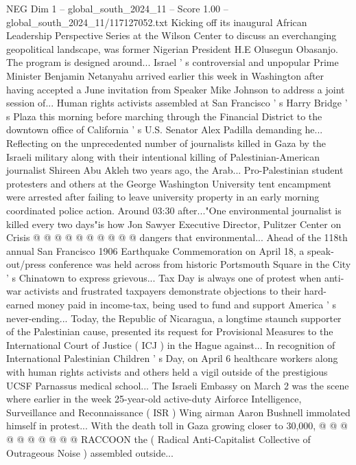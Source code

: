 \begin{textsample}{NEG Dim 1 – global\_south\_2024\_11 – Score 1.00 – global\_south\_2024\_11/117127052.txt}  \label{ex:f1_neg_282}
Kicking off its inaugural African Leadership Perspective Series at the Wilson Center to discuss an everchanging geopolitical landscape, was former Nigerian President H.E Olusegun Obasanjo.
The program is designed around...
Israel ' s controversial and unpopular Prime Minister Benjamin Netanyahu arrived earlier this week in Washington after having accepted a June invitation from Speaker Mike Johnson to address a joint session of...
Human rights activists assembled at San Francisco ' s Harry Bridge ' s Plaza this morning before marching through the Financial District to the downtown office of California ' s U.S.
Senator Alex Padilla demanding he...
Reflecting on the unprecedented number of journalists killed in Gaza by the Israeli military along with their intentional killing of Palestinian-American journalist Shireen Abu Akleh two years ago, the Arab...
Pro-Palestinian student protesters and others at the George Washington University tent encampment were arrested after failing to leave university property in an early morning coordinated police action.
Around 03:30 after..."One environmental journalist is killed every two days"is how Jon Sawyer Executive Director, Pulitzer Center on Crisis @ @ @ @ @ @ @ @ @ @ dangers that environmental...
Ahead of the 118th annual San Francisco 1906 Earthquake Commemoration on April 18, a speak-out/press conference was held across from historic Portsmouth Square in the City ' s Chinatown to express grievous...
Tax Day is always one of protest when anti-war activists and frustrated taxpayers demonstrate objections to their hard-earned money paid in income-tax, being used to fund and support America ' s never-ending...
Today, the Republic of Nicaragua, a longtime staunch supporter of the Palestinian cause, presented its request for Provisional Measures to the International Court of Justice ( ICJ ) in the Hague against...
In recognition of International Palestinian Children ' s Day, on April 6 healthcare workers along with human rights activists and others held a vigil outside of the prestigious UCSF Parnassus medical school...
The Israeli Embassy on March 2 was the scene where earlier in the week 25-year-old active-duty Airforce Intelligence, Surveillance and Reconnaissance ( ISR ) Wing airman Aaron Bushnell immolated himself in protest...
With the death toll in Gaza growing closer to 30,000, @ @ @ @ @ @ @ @ @ @ RACCOON the ( Radical Anti-Capitalist Collective of Outrageous Noise ) assembled outside...

\end{textsample}
